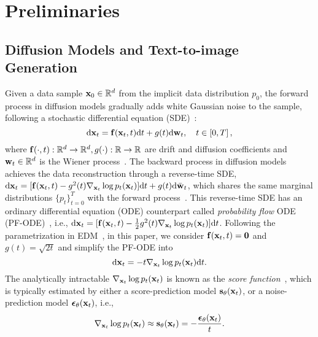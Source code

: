 \section{Preliminaries}


\subsection{Diffusion Models and Text-to-image Generation}
Given a data sample $\mathbf{x}_0 \in \mathbb{R}^d$ from the implicit data distribution $p_0$, the forward process in diffusion models gradually adds white Gaussian noise to the sample, following a stochastic differential equation (SDE)~\cite{song2021sde}:
\begin{equation}
    \label{eq:forward_sde}
    \mathrm{d}\mathbf{x}_t = \mathbf{f}(\mathbf{x}_t, t)\mathrm{d} t + g(t) \mathrm{d} \mathbf{w}_t, \quad t \in \left[0, T\right],
\end{equation}
where $\mathbf{f}(\cdot, t): \mathbb{R}^{d} \rightarrow \mathbb{R}^d, g(\cdot): \mathbb{R} \rightarrow \mathbb{R}$ are drift and diffusion coefficients and $\mathbf{w}_t \in \mathbb{R}^d$ is the Wiener process~\cite{oksendal2013stochastic}. 
The backward process in diffusion models achieves the data reconstruction through a reverse-time SDE, $\mathrm{d}\mathbf{x}_t = [\mathbf{f}(\mathbf{x}_t, t)- g^2(t)\nabla_{\mathbf{x}_t} \log p_{t}(\mathbf{x}_t)]\mathrm{d} t + g(t) \mathrm{d} \bar{\mathbf{w}}_t$, which shares the same marginal distributions $\{p_t\}_{t=0}^T$ with the forward process~\cite{song2021sde}. This reverse-time SDE has an ordinary differential equation (ODE) counterpart called \textit{probability flow} ODE (PF-ODE)~\cite{song2021sde,karras2022edm,chen2024trajectory}, i.e., $\mathrm{d}\mathbf{x}_t = [\mathbf{f}(\mathbf{x}_t, t)- \frac{1}{2}g^2(t)\nabla_{\mathbf{x}_t} \log p_{t}(\mathbf{x}_t)]\mathrm{d} t$. Following the parametrization in EDM~\cite{karras2022edm}, in this paper, we consider $\mathbf{f}(\mathbf{x}_t, t)=\mathbf{0}$ and $g(t)=\sqrt{2t}$ and simplify the PF-ODE into
\begin{equation}
    \label{eq:pf_ode}
    \mathrm{d}\mathbf{x}_t = -t \nabla_{\mathbf{x}_t} \log p_{t}(\mathbf{x}_t) \mathrm{d} t.
\end{equation}
The analytically intractable $\nabla_{\mathbf{x}_t} \log p_{t}(\mathbf{x}_t)$ is known as the \textit{score function}~\cite{hyvarinen2005estimation,lyu2009interpretation}, which is typically estimated by either a score-prediction model $\mathbf{s}_\theta(\mathbf{x}_t)$, or a noise-prediction model $\boldsymbol{\epsilon}_{\theta}(\mathbf{x}_t)$, i.e., 
\begin{equation}
    \label{eq:equalvalent}
    \nabla_{\bfx_t} \log p_{t}(\bfx_t) \approx \bfs_\theta(\bfx_t) = -\frac{\bfeps_{\theta}(\bfx_t)}{t}.%
\end{equation}
